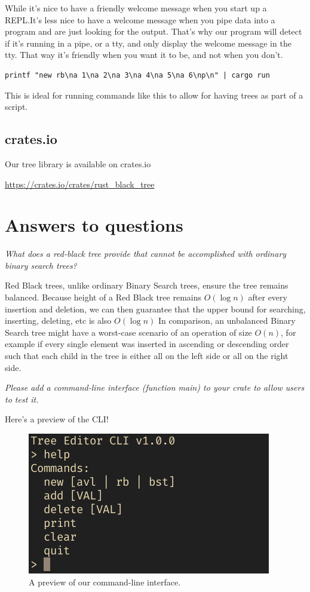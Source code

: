 \documentclass[letterpaper]{article}
\begin{document}
While it's nice to have a friendly welcome message when you start up a
REPL.\@ It's less nice to have a welcome message when you pipe data into
a program and are just looking for the output. That's why our program
will detect if it's running in a pipe, or a tty, and only display the
welcome message in the tty. That way it's friendly when you want it to
be, and not when you don't.

\begin{verbatim}
printf "new rb\na 1\na 2\na 3\na 4\na 5\na 6\np\n" | cargo run
\end{verbatim}

This is ideal for running commands like this to allow for having trees
as part of a script.

\subsection{crates.io}
Our tree library is available on crates.io

\url{https://crates.io/crates/rust_black_tree}

\section{Answers to questions}

\textit{What does a red-black tree provide that cannot be accomplished with
	ordinary binary search trees?}

Red Black trees, unlike ordinary Binary Search trees, ensure the tree
remains balanced. Because height of a Red Black tree remains \(O(\log
n)\) after every insertion and deletion, we can then guarantee that
the upper bound for searching, inserting, deleting, etc is also
\(O(\log n)\) In comparison, an unbalanced Binary Search tree might
have a worst-case scenario of an operation of size \(O(n)\), for
example if every single element was inserted in ascending or
descending order such that each child in the tree is either all on the
left side or all on the right side.

\textit{Please add a command-line interface (function main) to your crate to
	allow users to test it.}

Here's a preview of the CLI!
\begin{figure}[H]
	\centering
	\includegraphics[width=.8\textwidth]{cli.png}
	\caption{A preview of our command-line interface.}
\end{figure}
\end{document}
